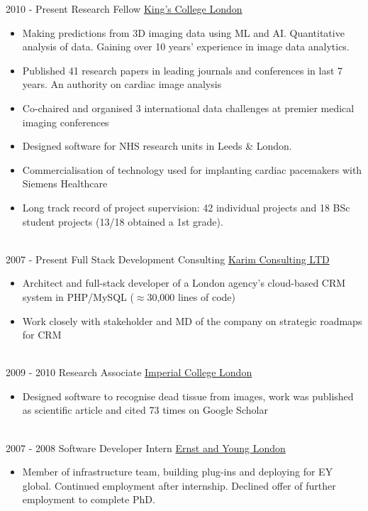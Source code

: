 \documentclass[letterpaper]{twentysecondcv} %
\begin{document}
\begin{twenty} %
\twentyitem
    	{2010 -}
		{Present}
        {Research Fellow}
        {\href{https://kclpure.kcl.ac.uk/portal/rashed.karim.html}{King's College London}}
        {}
        {\begin{itemize}
       \item Making predictions from 3D imaging data using ML and AI. Quantitative analysis of data. Gaining over 10 years' experience in image data analytics. 
\item Published 41 research papers in leading journals and conferences in last 7 years. An authority on cardiac image analysis
\item Co-chaired and organised 3 international data challenges at premier medical imaging conferences
\item Designed software for NHS research units in Leeds \& London. 
\item Commercialisation of technology used for implanting cardiac pacemakers with Siemens Healthcare
\item Long track record of project supervision: 42 individual projects and 18 BSc student projects (13/18 obtained a 1st grade). 
       
        \end{itemize}}
        \\
	\twentyitem
    	{2007 - }
		{Present}
        {Full Stack Development Consulting}
        {\href{http://www.desilvatutors.co.uk/}{Karim Consulting LTD}}
        {}
        {
        {
    \begin{itemize}
\item Architect and full-stack developer of a London agency's cloud-based CRM system in PHP/MySQL ($\approx$30,000 lines of code) 
		\item Work closely with stakeholder and MD of the company on strategic roadmaps for CRM 
    \end{itemize}}
        }
    
    \\   
    \twentyitem
   		{2009 -}
		{2010}
        {Research Associate}
        {\href{http://www.imperial.ac.uk}{Imperial College London}}
        {}
        {
        {\begin{itemize}
        \item Designed software to recognise dead tissue from images, work was published as scientific article and cited 73 times on Google Scholar
    \end{itemize}}
        }
     \\
     \twentyitem
   		{2007 -}
		{2008}
        {Software Developer Intern}
        {\href{http://www.ey.com/}{Ernst and Young London}}
        {}
        {
        \begin{itemize}
        \item Member of infrastructure team, building plug-ins and deploying for EY global. Continued employment after internship. Declined offer of further employment to complete PhD.
        \end{itemize}
     	}   
    \\   


\end{twenty}
\end{document}
